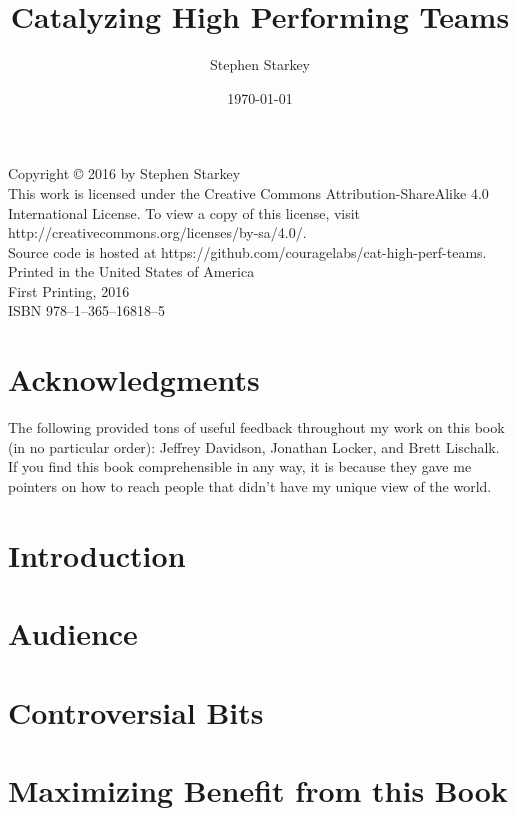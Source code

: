 \documentclass[12pt]{memoir}
\date{\today}
\title{Catalyzing High Performing Teams}
\author{Stephen Starkey}
\begin{document}
\frontmatter

\maketitle

\newpage

\noindent Copyright \copyright{} 2016 by Stephen Starkey \\ 

\noindent This work is licensed under the 
Creative Commons Attribution-ShareAlike 4.0 International License. To view a copy of this license, visit 
http://creativecommons.org/licenses/by-sa/4.0/. \\  

\noindent Source code is hosted at https://github.com/couragelabs/cat-high-perf-teams. \\ 

\noindent Printed in the United States of America \\ 

\noindent First Printing, 2016 \\ 

\noindent ISBN 978--1--365--16818--5

\newpage

\setcounter{secnumdepth}{1}
\setcounter{tocdepth}{1}
\tableofcontents
\newpage
\chapter{Acknowledgments}
The following provided tons of useful feedback throughout my work on this book (in no particular order):
Jeffrey Davidson, Jonathan Locker, and Brett Lischalk. If you find this book comprehensible in any way,
it is because they gave me pointers on how to reach people that didn't have my unique view of the world.

\chapter{Introduction}

\chapter{Audience}

\chapter{Controversial Bits}

\chapter{Maximizing Benefit from this Book}
\end{document}

